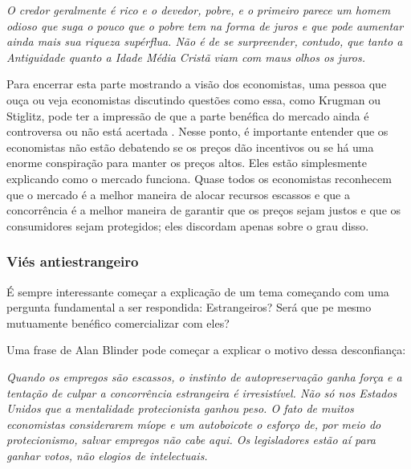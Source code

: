 \begin{citacao}
    \textit{O credor geralmente é rico e o devedor, pobre, e o primeiro parece um homem odioso que suga o pouco que o pobre tem na forma de juros e que pode aumentar ainda mais sua riqueza supérflua. Não é de se surpreender, contudo, que tanto a Antiguidade quanto a Idade Média Cristã viam com maus olhos os juros. 
    } \newline \cite{von2022capital}
\end{citacao}

Para encerrar esta parte mostrando a visão dos economistas, uma pessoa que ouça ou veja economistas discutindo questões como essa, como Krugman ou Stiglitz, pode ter a impressão de que a parte benéfica do mercado ainda é controversa ou não está acertada \cite{krugman2003great,stiglitz2003roaring,The_Myth_of_the_Rational_Voter}. Nesse ponto, é importante entender que os economistas não estão debatendo se os preços dão incentivos ou se há uma enorme conspiração para manter os preços altos. Eles estão simplesmente explicando como o mercado funciona. Quase todos os economistas reconhecem que o mercado é a melhor maneira de alocar recursos escassos e que a concorrência é a melhor maneira de garantir que os preços sejam justos e que os consumidores sejam protegidos; eles discordam apenas sobre o grau disso.

\subsubsection{Viés antiestrangeiro}

É sempre interessante começar a explicação de um tema começando com uma pergunta fundamental a ser respondida: Estrangeiros? Será que pe mesmo mutuamente benéfico comercializar com eles?

Uma frase de Alan Blinder pode começar a explicar o motivo dessa desconfiança:

\begin{citacao}
    \textit{
        Quando os empregos são escassos, o instinto de autopreservação ganha força e a tentação de culpar a concorrência estrangeira é irresistível. Não só nos Estados Unidos que a mentalidade protecionista ganhou peso. O fato de muitos economistas considerarem míope e um autoboicote o esforço de, por meio do protecionismo, salvar empregos não cabe aqui. Os legisladores estão aí para ganhar votos, não elogios de intelectuais.
     } \newline 
    \cite{blinder1987hard}
\end{citacao}

